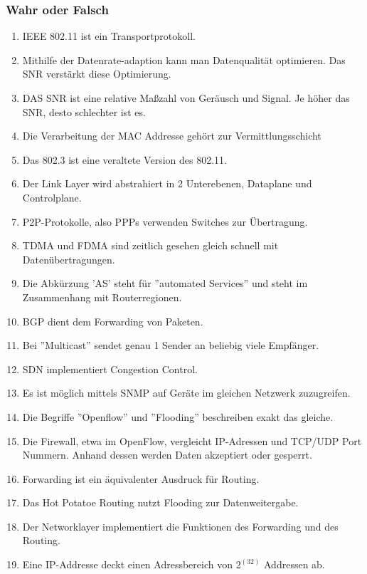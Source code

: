 \documentclass{scrartcl}
\begin{document}
    \subsubsection{Wahr oder Falsch}
    \begin{enumerate}
        \item IEEE 802.11 ist ein Transportprotokoll.
        \item Mithilfe der Datenrate-adaption kann man Datenqualität optimieren. Das SNR verstärkt diese Optimierung.
        \item DAS SNR ist eine relative Maßzahl von Geräusch und Signal. Je höher das SNR, desto schlechter ist es.
        \item Die Verarbeitung der MAC Addresse gehört zur Vermittlungsschicht
        \item Das 802.3 ist eine veraltete Version des 802.11.
        \item Der Link Layer wird abstrahiert in 2 Unterebenen, Dataplane und Controlplane.
        \item P2P-Protokolle, also PPPs verwenden Switches zur Übertragung.
        \item TDMA und FDMA sind zeitlich gesehen gleich schnell mit Datenübertragungen.
        \item Die Abkürzung 'AS' steht für ''automated Services'' und steht im Zusammenhang mit Routerregionen.
        \item BGP dient dem Forwarding von Paketen.
        \item Bei ''Multicast'' sendet genau 1 Sender an beliebig viele Empfänger.
        \item SDN implementiert Congestion Control.
        \item Es ist möglich mittels SNMP auf Geräte im gleichen Netzwerk zuzugreifen.
        \item Die Begriffe ''Openflow'' und ''Flooding'' beschreiben exakt das gleiche.
        \item Die Firewall, etwa im OpenFlow, vergleicht IP-Adressen und TCP/UDP Port Nummern. Anhand dessen werden Daten akzeptiert oder gesperrt.
        \item Forwarding ist ein äquivalenter Ausdruck für Routing.
        \item Das Hot Potatoe Routing nutzt Flooding zur Datenweitergabe.
        \item Der Networklayer implementiert die Funktionen des Forwarding und des Routing. 
        \item Eine IP-Addresse deckt einen Adressbereich von $2^(32)$ Addressen ab. 

\end{enumerate}
\end{document}
